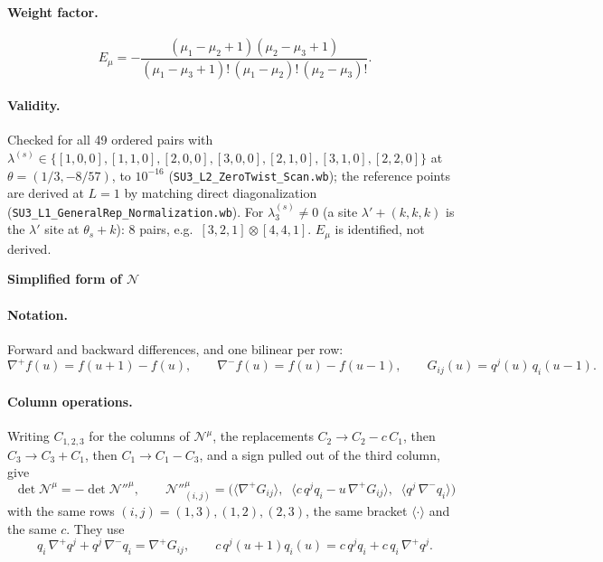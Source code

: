\documentclass[10pt]{article}
\begin{document}
\paragraph{Weight factor.}
\begin{equation}
E_\mu=-\frac{(\mu_1-\mu_2+1)(\mu_2-\mu_3+1)}{(\mu_1-\mu_3+1)!\,(\mu_1-\mu_2)!\,(\mu_2-\mu_3)!}.
\end{equation}

\paragraph{Validity.} Checked for all 49 ordered pairs with $\lambda^{(s)}\in\{[1,0,0],[1,1,0],[2,0,0],[3,0,0],[2,1,0],[3,1,0],[2,2,0]\}$ at $\theta=(1/3,-8/57)$, to $10^{-16}$ (\texttt{SU3\_L2\_ZeroTwist\_Scan.wb}); the reference points are derived at $L=1$ by matching direct diagonalization (\texttt{SU3\_L1\_GeneralRep\_Normalization.wb}). For $\lambda^{(s)}_3\neq0$ (a site $\lambda'+(k,k,k)$ is the $\lambda'$ site at $\theta_s+k$): 8 pairs, e.g.\ $[3,2,1]\otimes[4,4,1]$. $E_\mu$ is identified, not derived.


\newpage
\begin{center}
{\large\bf Simplified form of $\mathcal N$}
\end{center}

\paragraph{Notation.} Forward and backward differences, and one bilinear per row:
\begin{equation}
\nabla^+f(u)=f(u+1)-f(u),\qquad \nabla^-f(u)=f(u)-f(u-1),\qquad G_{ij}(u)=q^j(u)\,q_i(u-1).
\end{equation}

\paragraph{Column operations.} Writing $C_{1,2,3}$ for the columns of $\mathcal N^\mu$, the replacements
$C_2\to C_2-c\,C_1$, then $C_3\to C_3+C_1$, then $C_1\to C_1-C_3$, and a sign pulled out of the third column, give
\begin{equation}
\boxed{\;\det\mathcal N^\mu=-\det\mathcal N''^\mu,\qquad
\mathcal N''^\mu_{(i,j)}=\Big(\big\langle\nabla^+G_{ij}\big\rangle,\;\;
\big\langle c\,q^j q_i-u\,\nabla^+G_{ij}\big\rangle,\;\;
\big\langle q^j\,\nabla^-q_i\big\rangle\Big)\;}
\end{equation}
with the same rows $(i,j)=(1,3),(1,2),(2,3)$, the same bracket $\langle\cdot\rangle$ and the same $c$. They use
\begin{equation}
q_i\,\nabla^+q^j+q^j\,\nabla^-q_i=\nabla^+G_{ij},\qquad
c\,q^j(u{+}1)q_i(u)=c\,q^jq_i+c\,q_i\,\nabla^+q^j .
\end{equation}
\end{document}
